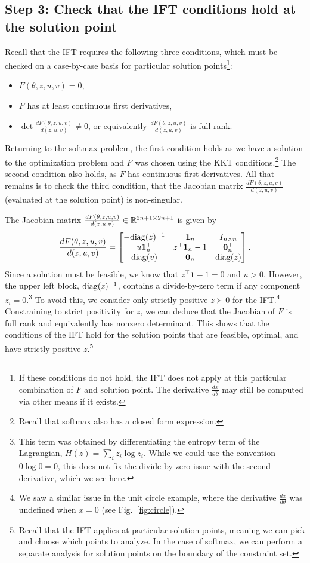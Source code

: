 \documentclass[11pt]{article}
\begin{document}
\subsection*{Step 3: Check that the IFT conditions hold at the solution point}
Recall that the IFT requires the following three conditions,
which must be checked on a case-by-case basis for particular
solution points\footnote{If these conditions do not hold,
the IFT does not apply at this particular combination of $F$ and solution point.
The derivative $\frac{dx}{d\theta}$ may still be computed via other means
if it exists.}:
\begin{itemize}
    \item $F(\theta,z,u,v) = 0$,
    \item $F$ has at least continuous first derivatives,
    \item $\det\frac{dF(\theta,z,u,v)}{d(z,u,v)} \ne 0$,
        or equivalently $\frac{dF(\theta,z,u,v)}{d(z,u,v)}$
        is full rank.
\end{itemize}
Returning to the softmax problem,
the first condition holds as we have a solution to the optimization problem
and $F$ was chosen using the KKT conditions.\footnote{
Recall that softmax also has a closed form expression.}
The second condition also holds, as $F$ has continuous first derivatives.
All that remains is to check the third condition,
that the Jacobian matrix $\frac{dF(\theta,z,u,v)}{d(z,u,v)}$
(evaluated at the solution point) is non-singular.

The Jacobian matrix $\frac{dF(\theta,z,u,v)}{d(z,u,v)}\in\mathbb{R}^{2n+1\times 2n+1}$ is given by
\begin{equation}
\label{eqn:f-jac}
\frac{dF(\theta,z,u,v)}{d(z,u,v)}=
\begin{bmatrix}
-\mathrm{diag}(z)^{-1} & \mathbf{1}_n & I_{n\times n} \\
u\mathbf{1}_n^\top & z^\top\mathbf{1}_n - 1 & \mathbf{0}^\top_n\\
\mathrm{diag}(v) & \mathbf{0}_n & \mathrm{diag}(z)
\end{bmatrix}.
\end{equation}
Since a solution must be feasible, we know that $z^\top\mathbf{1}-1=0$ and $u > 0$.
However, the upper left block, $\mathrm{diag}(z)^{-1}$, contains a divide-by-zero term if
any component $z_i = 0$.\footnote{
This term was obtained by differentiating the entropy
term of the Lagrangian, $H(z) = \sum_i z_i\log z_i$.
While we could use the convention $0\log 0 = 0$,
this does not fix the divide-by-zero issue with the second derivative, which we see here.
}
To avoid this, we consider only strictly positive $z \succ 0$ for the IFT.\footnote{
We saw a similar issue in the unit circle example, where the derivative
$\frac{dx}{d\theta}$ was undefined when $x=0$ (see Fig.~\ref{fig:circle}).
}
Constraining to strict positivity for $z$,
we can deduce that the Jacobian of $F$ is full rank and equivalently has nonzero determinant.
This shows that the conditions of the IFT hold for the solution points that are
feasible, optimal, and have strictly positive $z$.\footnote{
Recall that the IFT applies at particular solution points,
meaning we can pick and choose which points to analyze.
In the case of softmax, we can perform a separate analysis
for solution points on the boundary of the constraint set.
}
\end{document}
